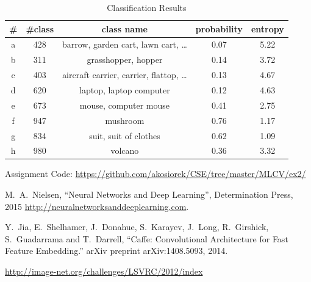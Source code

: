 \documentclass[journal, a4paper]{IEEEtran}
\begin{document}
  \begin{table}[h]
    \begin{center}
    \caption{Classification Results}
    \label{tab:results}
    \begin{tabular}{c|c|c|c|c}
      \# & \#class  & class name  & probability & entropy \\ \hline
      a & 428 & barrow, garden cart, lawn cart, \ldots & 0.07 & 5.22\\ \hline
      b & 311 & grasshopper, hopper & 0.14 & 3.72\\ \hline
      c & 403 & aircraft carrier, carrier, flattop, \ldots & 0.13 & 4.67\\ \hline
      d & 620 & laptop, laptop computer & 0.12 & 4.63\\ \hline
      e & 673 & mouse, computer mouse & 0.41 & 2.75\\ \hline
      f & 947 & mushroom & 0.76 & 1.17\\ \hline
      g & 834 & suit, suit of clothes & 0.62 & 1.09\\ \hline
      h & 980 & volcano & 0.36 & 3.32
    \end{tabular}
    \end{center}
  \end{table}


\begin{thebibliography}{5}

	Assignment Code: \url{https://github.com/akosiorek/CSE/tree/master/MLCV/ex2/}
	
	M.~A.~Nielsen, ``Neural Networks and Deep Learning'', Determination Press, 2015
	\url{http://neuralnetworksanddeeplearning.com}.
	
	Y.~Jia, E.~Shelhamer, J.~Donahue, S.~Karayev, J.~Long, R.~Girshick, S.~Guadarrama and T.~Darrell, ``Caffe: Convolutional Architecture for Fast Feature Embedding.'' arXiv preprint arXiv:1408.5093, 2014.
	
	\url{http://image-net.org/challenges/LSVRC/2012/index}

\end{thebibliography}

\end{document}
